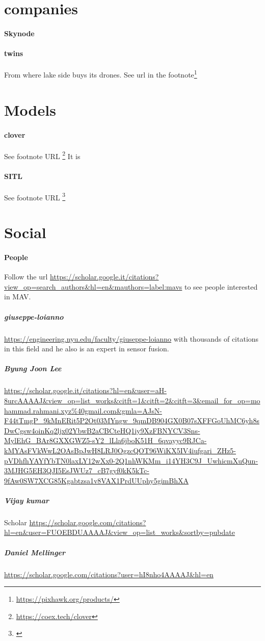 \documentclass{article}
\begin{document}
	\section{companies}
		\paragraph{Skynode}
		\paragraph{twins}
			From where lake side buys its drones. See url in the footnote\footnote{\url{https://pixhawk.org/products/}} 
	\section{Models}
		\paragraph{clover} See footnote URL \footnote{\url{https://coex.tech/clover}} It is 
		\paragraph{SITL} See footnote URL \footnote{\url{}}	
	\section{Social}
		\paragraph{People}
		Follow the url \url{https://scholar.google.it/citations?view_op=search_authors\&hl=en\&mauthors=label:mavs} to see people interested in MAV. 
			\subparagraph{giuseppe-loianno} \url{https://engineering.nyu.edu/faculty/giuseppe-loianno} with thousands of citations in this field and he also is an expert in sensor fusion.
			\subparagraph{Byung Joon Lee} \url{https://scholar.google.it/citations?hl=en\&user=aH-8urcAAAAJ\&view_op=list_works\&citft=1\&citft=2\&citft=3\&email_for_op=mohammad.rahmani.xyz%40gmail.com&gmla=AJsN-F44tTmgP_9kMnERit5P2Ot03MYngw_9qmDB904GX0B07sXFFGoUhMC6yh8sDwCgsw4oinKq2ljx02YbwB2aCBCteHQ1iy9XzFBNYCV3Sns-MylEhG_BAr8GXXGWZ5-sY2_lLla6jboK51H_6qvayyc9RJCa-kMYAsFVkWwL2OAsBpJwH8LRJ0OgzcQOT96WiKX5IV4iufgari_ZHz5-pVDhfhYAYfYbTN0laxLY12wXx0-2Q1nhWKMm_i14YH3C9J_UwhicmXuQun-3MJHG5EH3QJI5EsJWUz7_cB7gyf0kK5kTc-9fAw0SW7XCG85Kgabtzsa1v8VAX1PrdUUphy5gimBhXA}
				
			\subparagraph{Vijay kumar} Scholar \url{https://scholar.google.com/citations?hl=en\&user=FUOEBDUAAAAJ\&view_op=list_works\&sortby=pubdate}
			
			\subparagraph{Daniel Mellinger}
			\url{https://scholar.google.com/citations?user=hI8nho4AAAAJ\&hl=en}
	
\end{document}
